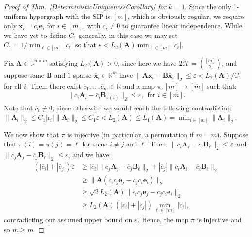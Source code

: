 \documentclass[journal, twocolumn]{IEEEtran}
\begin{document}
\begin{proof}[Proof of Thm.~\ref{DeterministicUniquenessCorollary} for $k=1$]
Since the only 1-uniform hypergraph with the SIP is $[m]$, which is obviously regular, we require only $\mathbf{x}_i = c_i \mathbf{e}_i$ for $i \in [m]$, with $c_i \neq 0$ to guarantee  linear independence. While we have yet to define $C_1$ generally, in this case we may set $C_1 = 1/ \min_{\ell \in [m]} |c_{\ell}|$ so that $\varepsilon < L_2(\mathbf{A})  \min_{\ell \in [m]} |c_{\ell}|$. 

Fix $\mathbf{A} \in \mathbb{R}^{n \times m}$ satisfying $L_2(\mathbf{A}) > 0$, since here we have $2\mathcal{H} = {[m] \choose 2}$, and suppose some $\mathbf{B}$ and $1$-sparse $\mathbf{\overline x}_i \in \mathbb{R}^{\overline m}$ have  $\|\mathbf{A}\mathbf{x}_i - \mathbf{B}\mathbf{\overline x}_i\|_2 \leq \varepsilon < L_2(\mathbf{A}) / C_1$ for all $i$. Then, there exist $\overline{c}_1, \ldots, \overline{c}_m \in \mathbb{R}$ and a map $\pi: [m] \to [\overline m]$ such that:
\begin{align}\label{1D}
\|c_i\mathbf{A}_i - \overline{c}_i\mathbf{B}_{\pi(i)}\|_2 \leq \varepsilon,\ \ \text{for $i \in [m]$}.
\end{align} 
Note that $\overline{c}_i \neq 0$, since otherwise we would reach the following contradiction: $\|\mathbf{A}_i \|_2 \leq C_1 |c_i| \|\mathbf{A}_i \|_2  \leq C_1\varepsilon < L_2(\mathbf{A}) \leq L_1(\mathbf{A}) = \min_{i \in [m]} \|\mathbf{A}_{i}\|_2$. %

We now show that $\pi$ is injective (in particular, a permutation if $\overline m = m$). Suppose that $\pi(i) = \pi(j) = \ell$ for some $i \neq j$ and $\ell$. Then, $\|c_{i}\mathbf{A}_{i} - \overline{c}_{i} \mathbf{B}_{\ell}\|_2  \leq \varepsilon$ and $\|c_{j}\mathbf{A}_{j} - \overline{c}_{j}\mathbf{B}_{\ell}\|_2 \leq \varepsilon$, and we have: %
\begin{align*}
(|\overline{c}_{i}| + |\overline{c}_{j}|) \varepsilon
&\geq |\overline{c}_{i}| \|c_{j}\mathbf{A}_{j} - \overline{c}_{j}\mathbf{B}_{\ell}\|_2  + |\overline{c}_{j}| \|c_{i}\mathbf{A}_{i} - \overline{c}_{i} \mathbf{B}_{\ell}\|_2 \nonumber \\
&\geq \|\mathbf{A}(\overline{c}_{i}c_{j} \mathbf{e}_{j} - \overline{c}_{j}c_{i}\mathbf{e}_{i})\|_2 \nonumber \\ 
&\geq \sqrt{2}  L_2(\mathbf{A}) \|\overline{c}_{i}c_{j} \mathbf{e}_{j} - \overline{c}_{j}c_{i}\mathbf{e}_{i}\|_2 \nonumber \\
&\geq  L_2(\mathbf{A}) \left( |\overline{c}_{i}| + |\overline{c}_{j}| \right) \min_{\ell \in [m]} |c_\ell |,
\end{align*}
contradicting our assumed upper bound on $\varepsilon$. Hence, the map $\pi$ is injective and so $\overline m \geq m$. %


\end{proof}
\end{document}
